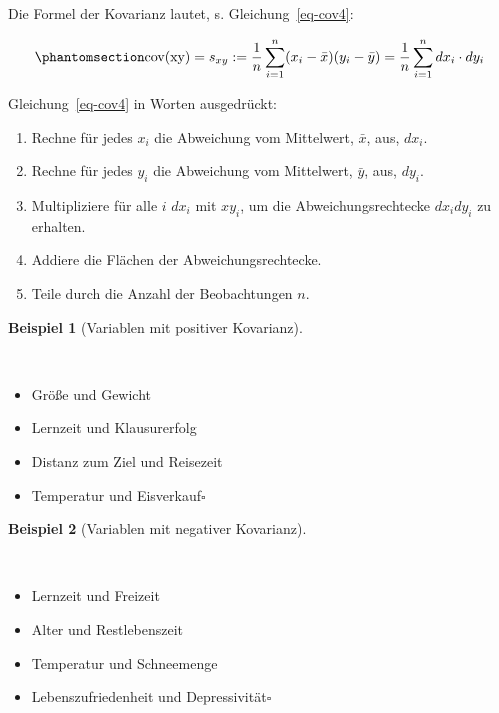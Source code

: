 \documentclass[
  a4paper,
]{scrbook}
\providecommand{\tightlist}{%
  \setlength{\itemsep}{0pt}\setlength{\parskip}{0pt}}\usepackage{longtable,booktabs,array}
\theoremstyle{definition}
\newtheorem{example}{Beispiel}[chapter]
\theoremstyle{definition}
\theoremstyle{definition}
\theoremstyle{remark}
\begin{document}
Die Formel der Kovarianz lautet, s. Gleichung~\ref{eq-cov4}:

\begin{equation}\phantomsection\label{eq-cov4}{\text{cov(xy)} = s_{xy}:=\frac{1}{n}\sum_{i=1}^n (x_i-\bar{x})(y_i-\bar{y}) = \frac{1}{n}\sum_{i=1}^n dx_i\cdot dy_i}\end{equation}

Gleichung~\ref{eq-cov4} in Worten ausgedrückt:

\begin{enumerate}
\def\labelenumi{\arabic{enumi}.}
\tightlist
\item
  Rechne für jedes \(x_i\) die Abweichung vom Mittelwert, \(\bar{x}\),
  aus, \(dx_i\).
\item
  Rechne für jedes \(y_i\) die Abweichung vom Mittelwert, \(\bar{y}\),
  aus, \(dy_i\).
\item
  Multipliziere für alle \(i\) \(dx_i\) mit \(xy_i\), um die
  Abweichungsrechtecke \(dx_i dy_i\) zu erhalten.
\item
  Addiere die Flächen der Abweichungsrechtecke.
\item
  Teile durch die Anzahl der Beobachtungen \(n\).
\end{enumerate}

\begin{example}[Variablen mit positiver
Kovarianz]\protect\hypertarget{exm-pos-kov}{}\label{exm-pos-kov}

~

\begin{itemize}
\tightlist
\item
  Größe und Gewicht
\item
  Lernzeit und Klausurerfolg
\item
  Distanz zum Ziel und Reisezeit
\item
  Temperatur und Eisverkauf\(\square\)
\end{itemize}

\end{example}

\begin{example}[Variablen mit negativer
Kovarianz]\protect\hypertarget{exm-neg-kov}{}\label{exm-neg-kov}

~

\begin{itemize}
\tightlist
\item
  Lernzeit und Freizeit
\item
  Alter und Restlebenszeit
\item
  Temperatur und Schneemenge
\item
  Lebenszufriedenheit und Depressivität\(\square\)
\end{itemize}

\end{example}
\end{document}
